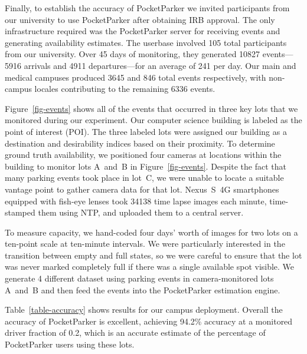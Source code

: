 Finally, to establish the accuracy of PocketParker we invited participants
from our university to use PocketParker after obtaining IRB approval. The
only infrastructure required was the PocketParker server for receiving events
and generating availability estimates. The userbase involved 105 total
participants from our university.  Over 45 days of monitoring, they generated
\num{10827} events---5916 arrivals and 4911 departures---for an average of 241
per day. Our main and medical campuses produced 3645 and 846 total events
respectively, with non-campus locales contributing to the remaining 6336
events.

Figure~\ref{fig-events} shows all of the events that occurred in three key
lots that we monitored during our experiment. Our computer science building
is labeled as the point of interest (POI). The three labeled lots were
assigned our building as a destination and desirability indices based on
their proximity. To determine ground truth availability, we positioned four
cameras at locations within the building to monitor lots A~and~B in
Figure~\ref{fig-events}. Despite the fact that many parking events took place
in lot~C, we were unable to locate a suitable vantage point to gather camera
data for that lot. Nexus~S~4G smartphones equipped with fish-eye lenses took
\num{34138} time lapse images each minute, time-stamped them using NTP, and
uploaded them to a central server.

To measure capacity, we hand-coded four days' worth of images for two lots on
a ten-point scale at ten-minute intervals. We were particularly interested
in the transition between empty and full states, so we were careful to ensure
that the lot was never marked completely full if there was a single available
spot visible. We generate 4 different dataset using parking events in 
camera-monitored lots A~and~B and then feed the events into the PocketParker
estimation engine.

Table~\ref{table-accuracy} shows results for our campus deployment. Overall
the accuracy of PocketParker is excellent, achieving 94.2\% accuracy at a
monitored driver fraction of 0.2, which is an accurate estimate of the
percentage of PocketParker users using these lots.
